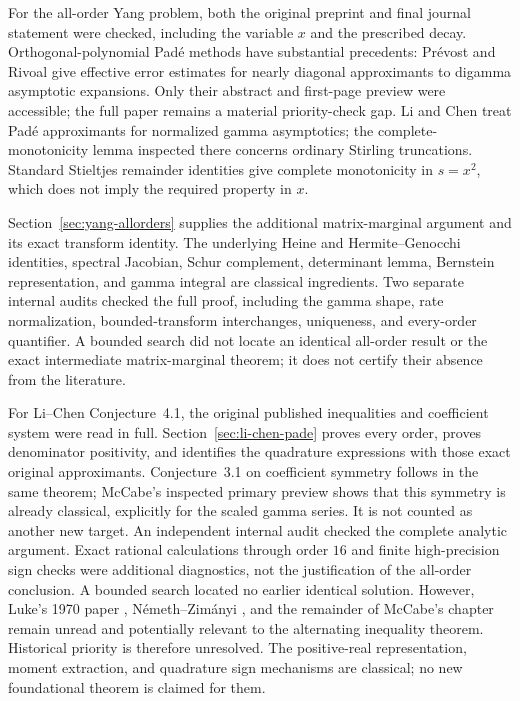 \documentclass[11pt,a4paper]{article}
\theoremstyle{definition}
\theoremstyle{remark}
\numberwithin{equation}{section}
\begin{document}
For the all-order Yang problem, both the original preprint and final
journal statement were checked, including the variable $x$ and the
prescribed decay. Orthogonal-polynomial Pad\'e methods have substantial
precedents: Pr\'evost and Rivoal \cite{PrevostRivoal2021} give effective
error estimates for nearly diagonal approximants to digamma asymptotic
expansions. Only their abstract and first-page preview were accessible;
the full paper remains a material priority-check gap. Li and Chen
\cite{LiChen2017} treat Pad\'e approximants for normalized gamma
asymptotics; the complete-monotonicity lemma inspected there concerns
ordinary Stirling truncations. Standard Stieltjes remainder identities
give complete monotonicity in $s=x^2$, which does not imply the required
property in $x$.

Section~\ref{sec:yang-allorders} supplies the additional matrix-marginal
argument and its exact transform identity. The underlying Heine and
Hermite--Genocchi identities, spectral Jacobian, Schur complement,
determinant lemma, Bernstein representation, and gamma integral are
classical ingredients. Two separate internal audits checked the full
proof, including the gamma shape, rate normalization, bounded-transform
interchanges, uniqueness, and every-order quantifier. A bounded search
did not locate an identical all-order result or the exact intermediate
matrix-marginal theorem; it does not certify their absence from the
literature.

For Li--Chen Conjecture~4.1, the original published inequalities and
coefficient system were read in full. Section~\ref{sec:li-chen-pade}
proves every order, proves denominator positivity, and identifies the
quadrature expressions with those exact original approximants.
Conjecture~3.1 on coefficient symmetry follows in the same theorem;
McCabe's inspected primary preview \cite[pp.~67--68]{McCabe1989}
shows that this symmetry is already classical, explicitly for the scaled
gamma series. It is not counted as another new target. An independent internal
audit checked the complete analytic argument. Exact rational calculations
through order $16$ and finite high-precision sign checks were additional
diagnostics, not the justification of the all-order conclusion.
A bounded search located no earlier identical solution. However, Luke's
1970 paper \cite{Luke1970}, N\'emeth--Zim\'anyi
\cite{NemethZimanyi1982}, and the remainder of McCabe's chapter
\cite{McCabe1989} remain unread and potentially relevant to the
alternating inequality theorem.
Historical priority is therefore unresolved. The positive-real
representation, moment extraction, and quadrature sign mechanisms are
classical; no new foundational theorem is claimed for them.
\end{document}
